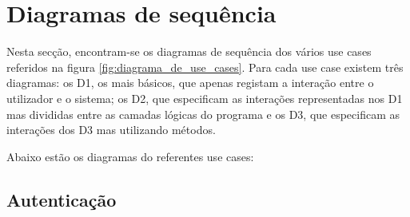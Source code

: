 \section{Diagramas de sequência}

Nesta secção, encontram-se os diagramas de sequência dos vários use cases referidos na figura \ref{fig:diagrama_de_use_cases}. Para cada use case existem três diagramas: os D1, os mais básicos, que apenas registam a interação entre o utilizador e o sistema; os D2, que especificam as interações representadas nos D1 mas divididas entre as camadas lógicas do programa e os D3, que especificam as interações dos D3 mas utilizando métodos.

Abaixo estão os diagramas do referentes use cases:

\subsection{Autenticação}

